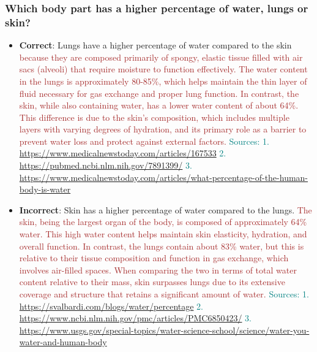 \subsubsection*{Which body part has a higher percentage of water, lungs or skin?}
\begin{itemize}[leftmargin=*]
    \item \textbf{Correct}: Lungs have a higher percentage of water compared to the skin \textcolor{brown}{because they are composed primarily of spongy, elastic tissue filled with air sacs (alveoli) that require moisture to function effectively. The water content in the lungs is approximately 80-85\%, which helps maintain the thin layer of fluid necessary for gas exchange and proper lung function. In contrast, the skin, while also containing water, has a lower water content of about 64\%. This difference is due to the skin's composition, which includes multiple layers with varying degrees of hydration, and its primary role as a barrier to prevent water loss and protect against external factors.} \textcolor{teal}{Sources: 1. \url{https://www.medicalnewstoday.com/articles/167533} 2. \url{https://pubmed.ncbi.nlm.nih.gov/7891399/} 3. \url{https://www.medicalnewstoday.com/articles/what-percentage-of-the-human-body-is-water}}
    \item \textbf{Incorrect}: Skin has a higher percentage of water compared to the lungs. \textcolor{brown}{The skin, being the largest organ of the body, is composed of approximately 64\% water. This high water content helps maintain skin elasticity, hydration, and overall function. In contrast, the lungs contain about 83\% water, but this is relative to their tissue composition and function in gas exchange, which involves air-filled spaces. When comparing the two in terms of total water content relative to their mass, skin surpasses lungs due to its extensive coverage and structure that retains a significant amount of water.} \textcolor{teal}{Sources: 1. \url{https://svalbardi.com/blogs/water/percentage} 2. \url{https://www.ncbi.nlm.nih.gov/pmc/articles/PMC6850423/} 3. \url{https://www.usgs.gov/special-topics/water-science-school/science/water-you-water-and-human-body}}
\end{itemize}

